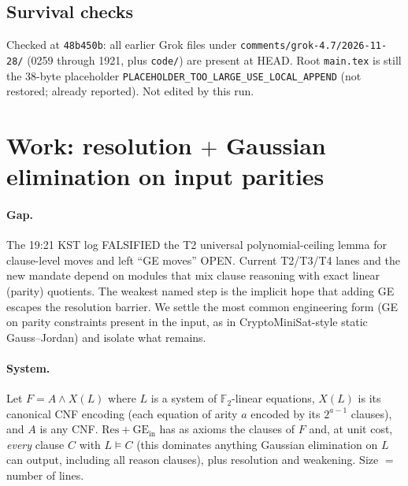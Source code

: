 \documentclass[11pt]{article}
\begin{document}
\subsection*{Survival checks}
Checked at \texttt{48b450b}: all earlier Grok files under \texttt{comments/grok-4.7/2026-11-28/} (0259 through 1921, plus \texttt{code/}) are present at HEAD. Root \texttt{main.tex} is still the 38-byte placeholder \texttt{PLACEHOLDER\_TOO\_LARGE\_USE\_LOCAL\_APPEND} (not restored; already reported). Not edited by this run.

\section{Work: resolution $+$ Gaussian elimination on input parities}
\paragraph{Gap.} The 19:21 KST log FALSIFIED the T2 universal polynomial-ceiling lemma for clause-level moves and left ``GE moves'' OPEN. Current T2/T3/T4 lanes and the new mandate depend on modules that mix clause reasoning with exact linear (parity) quotients. The weakest named step is the implicit hope that adding GE escapes the resolution barrier. We settle the most common engineering form (GE on parity constraints present in the input, as in CryptoMiniSat-style static Gauss--Jordan) and isolate what remains.

\paragraph{System.} Let $F=A\wedge X(L)$ where $L$ is a system of $\mathbb{F}_2$-linear equations, $X(L)$ is its canonical CNF encoding (each equation of arity $a$ encoded by its $2^{a-1}$ clauses), and $A$ is any CNF. \emph{$\mathrm{Res}{+}\mathrm{GE}_{\mathrm{in}}$} has as axioms the clauses of $F$ and, at unit cost, \emph{every} clause $C$ with $L\models C$ (this dominates anything Gaussian elimination on $L$ can output, including all reason clauses), plus resolution and weakening. Size $=$ number of lines.
\end{document}

